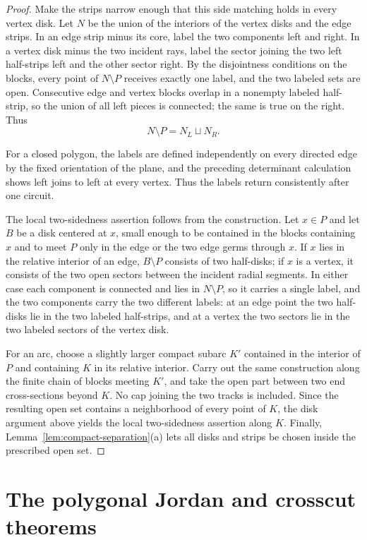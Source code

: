 \documentclass[11pt]{article}
\theoremstyle{mainplain}
\theoremstyle{mainroman}
\theoremstyle{definition}
\numberwithin{equation}{section}
\begin{document}
\begin{proof}
Make the strips narrow enough that this side matching holds in every
vertex disk. Let $N$ be the union of the interiors of the vertex disks
and the edge strips. In an edge strip minus its core, label the two
components left and right. In a vertex disk minus the two incident
rays, label the sector joining the two left half-strips left and the
other sector right. By the disjointness conditions on the blocks, every
point of $N\setminus P$ receives exactly one label, and the two labeled
sets are open. Consecutive edge and vertex blocks overlap in a nonempty
labeled half-strip, so the union of all left pieces is connected; the
same is true on the right. Thus
\[
 N\setminus P=N_L\sqcup N_R.
\]

For a closed polygon, the labels are defined independently on every
directed edge by the fixed orientation of the plane, and the preceding
determinant calculation shows left joins to left at every vertex. Thus the
labels return consistently after one circuit.

The local two-sidedness assertion follows from the construction. Let
$x\in P$ and let $B$ be a disk centered at $x$, small enough to be
contained in the blocks containing $x$ and to meet $P$ only in the
edge or the two edge germs through $x$. If $x$ lies in the relative
interior of an edge, $B\setminus P$ consists of two half-disks; if $x$
is a vertex, it consists of the two open sectors between the incident
radial segments. In either case each component is connected and lies
in $N\setminus P$, so it carries a single label, and the two
components carry the two different labels: at an edge point the two
half-disks lie in the two labeled half-strips, and at a vertex the
two sectors lie in the two labeled sectors of the vertex disk.

For an arc, choose a slightly larger compact subarc $K'$ contained in
the interior of $P$ and containing $K$ in its relative interior. Carry
out the same construction along the finite chain of blocks meeting
$K'$, and take the open part between two end cross-sections beyond $K$.
No cap joining the two tracks is included. Since the resulting open
set contains a neighborhood of every point of $K$, the disk argument
above yields the local two-sidedness assertion along $K$. Finally,
Lemma~\ref{lem:compact-separation}\textup{(a)} lets all disks and strips be
chosen inside the prescribed open set.
\end{proof}

\section{The polygonal Jordan and crosscut theorems}
\end{document}
